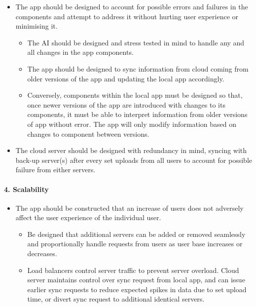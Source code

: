 \documentclass[a4paper,11pt]{article} %
\begin{document}
\begin{itemize}
\item
  The app should be designed to account for possible errors and failures
  in the components and attempt to address it without hurting user
  experience or minimising it.

  \begin{itemize}
  \item
    The AI should be designed and stress tested in mind to handle any
    and all changes in the app components.
  \item
    The app should be designed to sync information from cloud coming
    from older versions of the app and updating the local app
    accordingly.
  \item
    Conversely, components within the local app must be designed so
    that, once newer versions of the app are introduced with changes to
    its components, it must be able to interpret information from older
    versions of app without error. The app will only modify information
    based on changes to component between versions.
  \end{itemize}
\item
  The cloud server should be designed with redundancy in mind, syncing
  with back-up server(s) after every set uploads from all users to
  account for possible failure from either servers.
\end{itemize}

\hypertarget{scalability}{%
\paragraph{4. Scalability}\label{scalability}}

\begin{itemize}
\item
  The app should be constructed that an increase of users does not
  adversely affect the user experience of the individual user.

  \begin{itemize}
  \item
    Be designed that additional servers can be added or removed
    seamlessly and proportionally handle requests from users as user
    base increases or decreases.
  \item
    Load balancers control server traffic to prevent server overload.
    Cloud server maintains control over sync request from local app, and
    can issue earlier sync requests to reduce expected spikes in data
    due to set upload time, or divert sync request to additional
    identical servers.
  \end{itemize}
\end{itemize}
\end{document}
